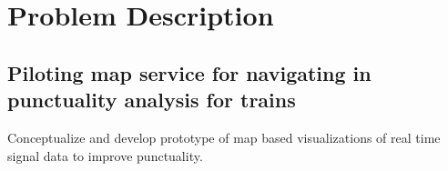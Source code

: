 




\section*{Problem Description} %
\label{sec:_problem_description}


\subsection*{Piloting map service for navigating in punctuality analysis for 
trains}

Conceptualize and develop prototype of map based visualizations of real time signal data to improve punctuality.


